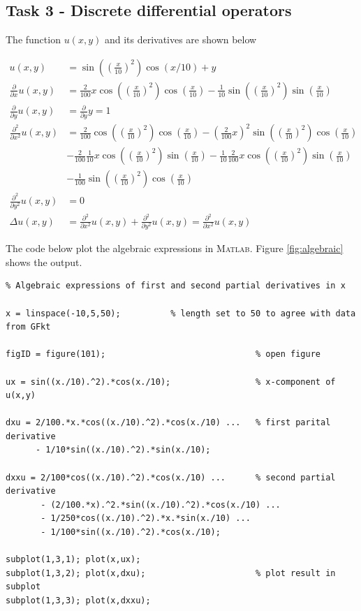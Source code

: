 \documentclass[paper=a4, fontsize=12pt]{article} %
\begin{document}
\subsection*{Task 3 - Discrete differential operators}

The function $u(x,y)$ and its derivatives are shown below

\begin{align*}
u(x,y) &= \sin\left(\left(\frac{x}{10}\right) ^2\right ) \cos(x/10)+y \\
\frac{\partial}{\partial x} u(x,y) &= \frac{2}{100}x\cos\left(\left(\frac{x}{10}\right) ^2\right )\cos\left(\frac{x}{10}\right )- \frac{1}{10}\sin\left(\left(\frac{x}{10}\right) ^2\right )\sin\left (\frac{x}{10}\right )\\
\frac{\partial}{\partial y} u(x,y) &= \frac{\partial}{\partial y}y = 1   \\
\frac{\partial^2}{\partial x^2} u(x,y) &= \frac{2}{100}\cos\left(\left(\frac{x}{10}\right) ^2\right )\cos\left(\frac{x}{10}\right ) - \left ( \frac{2}{100}x\right )^2 \sin \left(\left(\frac{x}{10}\right) ^2\right )\cos\left(\frac{x}{10}\right ) \\
 &- \frac{2}{100}\frac{1}{10}x\cos\left(\left(\frac{x}{10}\right) ^2\right )\sin\left(\frac{x}{10}\right ) - \frac{1}{10}\frac{2}{100}x \cos\left(\left(\frac{x}{10}\right) ^2\right )\sin\left (\frac{x}{10}\right )\\
 & - \frac{1}{100}\sin\left(\left(\frac{x}{10}\right) ^2\right )\cos\left (\frac{x}{10}\right )\\
\frac{\partial^2}{\partial y^2} u(x,y) &= 0 \\
\Delta u(x,y) &= \frac{\partial^2}{\partial x^2} u(x,y) + \frac{\partial^2}{\partial y^2} u(x,y) =  \frac{\partial^2}{\partial x^2} u(x,y)
\end{align*}


The code below plot the algebraic expressions in \textsc{Matlab}. Figure \ref{fig:algebraic} shows the output.

\begin{lstlisting}
% Algebraic expressions of first and second partial derivatives in x

x = linspace(-10,5,50);		     % length set to 50 to agree with data from GFkt

figID = figure(101);                              % open figure

ux = sin((x./10).^2).*cos(x./10);                 % x-component of u(x,y)

dxu = 2/100.*x.*cos((x./10).^2).*cos(x./10) ...   % first parital derivative
      - 1/10*sin((x./10).^2).*sin(x./10);

dxxu = 2/100*cos((x./10).^2).*cos(x./10) ...      % second partial derivative
       - (2/100.*x).^2.*sin((x./10).^2).*cos(x./10) ...
       - 1/250*cos((x./10).^2).*x.*sin(x./10) ...
       - 1/100*sin((x./10).^2).*cos(x./10);
       
subplot(1,3,1); plot(x,ux);
subplot(1,3,2); plot(x,dxu);                      % plot result in subplot
subplot(1,3,3); plot(x,dxxu);

\end{lstlisting}
\end{document}
